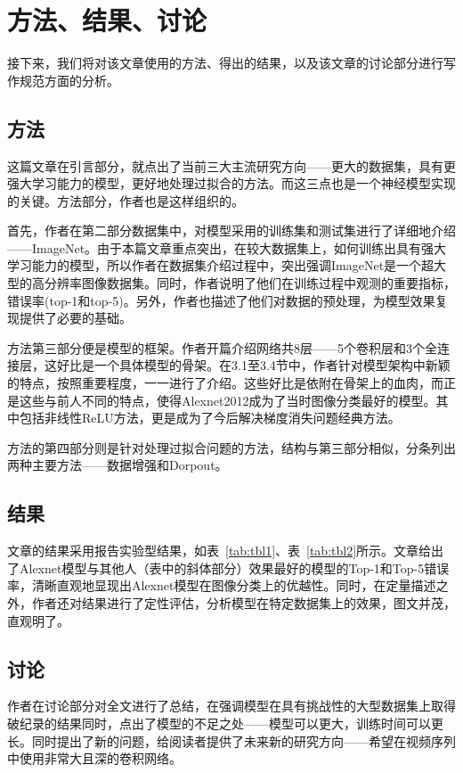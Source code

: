 \chapter{方法、结果、讨论}\label{chap:res}
接下来，我们将对该文章使用的方法、得出的结果，以及该文章的讨论部分进行写作规范方面的分析。
\section{方法}
这篇文章在引言部分，就点出了当前三大主流研究方向——更大的数据集，具有更强大学习能力的模型，更好地处理过拟合的方法。而这三点也是一个神经模型实现的关键。方法部分，作者也是这样组织的。

首先，作者在第二部分数据集中，对模型采用的训练集和测试集进行了详细地介绍——ImageNet。由于本篇文章重点突出，在较大数据集上，如何训练出具有强大学习能力的模型，所以作者在数据集介绍过程中，突出强调ImageNet是一个超大型的高分辨率图像数据集。同时，作者说明了他们在训练过程中观测的重要指标，错误率(top-1和top-5)。另外，作者也描述了他们对数据的预处理，为模型效果复现提供了必要的基础。

方法第三部分便是模型的框架。作者开篇介绍网络共8层——5个卷积层和3个全连接层，这好比是一个具体模型的骨架。在3.1至3.4节中，作者针对模型架构中新颖的特点，按照重要程度，一一进行了介绍。这些好比是依附在骨架上的血肉，而正是这些与前人不同的特点，使得Alexnet2012成为了当时图像分类最好的模型。其中包括非线性ReLU方法，更是成为了今后解决梯度消失问题经典方法。

方法的第四部分则是针对处理过拟合问题的方法，结构与第三部分相似，分条列出两种主要方法——数据增强和Dorpout。
\section{结果}

文章的结果采用报告实验型结果，如表~\ref{tab:tbl1}、表~\ref{tab:tbl2}所示。文章给出了Alexnet模型与其他人（表中的斜体部分）效果最好的模型的Top-1和Top-5错误率，清晰直观地显现出Alexnet模型在图像分类上的优越性。同时，在定量描述之外，作者还对结果进行了定性评估，分析模型在特定数据集上的效果，图文并茂，直观明了。

\section{讨论}
作者在讨论部分对全文进行了总结，在强调模型在具有挑战性的大型数据集上取得破纪录的结果同时，点出了模型的不足之处——模型可以更大，训练时间可以更长。同时提出了新的问题，给阅读者提供了未来新的研究方向——希望在视频序列中使用非常大且深的卷积网络。
